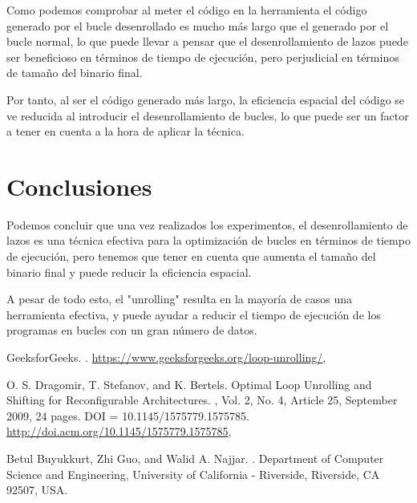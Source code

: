 \documentclass[a4paper,twocolumn]{article}
\begin{document}
Como podemos comprobar al meter el código en la herramienta el código generado por el bucle desenrollado es mucho más largo que el generado por el bucle normal, lo que puede llevar a pensar que el desenrollamiento de lazos puede ser beneficioso en términos de tiempo de ejecución, pero perjudicial en términos de tamaño del binario final. 

Por tanto, al ser el código generado más largo, la eficiencia espacial del código se ve reducida al introducir el desenrollamiento de bucles, lo que puede ser un factor a tener en cuenta a la hora de aplicar la técnica.

	
\section{Conclusiones}

Podemos concluir que una vez realizados los experimentos, el desenrollamiento de lazos es una técnica efectiva para la optimización de bucles en términos de tiempo de ejecución, pero tenemos que tener en cuenta que aumenta el tamaño del binario final y puede reducir la eficiencia espacial. 

A pesar de todo esto, el "unrolling" resulta en la mayoría de casos una herramienta efectiva, y puede ayudar a reducir el tiempo de ejecución de los programas en bucles con un gran número de datos.

	
\begin{thebibliography}{99} %

    GeeksforGeeks.
    .
    \newblock \url{https://www.geeksforgeeks.org/loop-unrolling/}, \newblock [online]
    
    O. S. Dragomir, T. Stefanov, and K. Bertels.
    \newblock Optimal Loop Unrolling and Shifting for Reconfigurable Architectures.
    , Vol. 2, No. 4, Article 25, September 2009, 24 pages.
    \newblock DOI = 10.1145/1575779.1575785.
    \newblock \url{http://doi.acm.org/10.1145/1575779.1575785}, \newblock [online]

    Betul Buyukkurt, Zhi Guo, and Walid A. Najjar.
    .
    \newblock Department of Computer Science and Engineering, University of California - Riverside, Riverside, CA 92507, USA.
    
\end{thebibliography}


	
	
\end{document}
